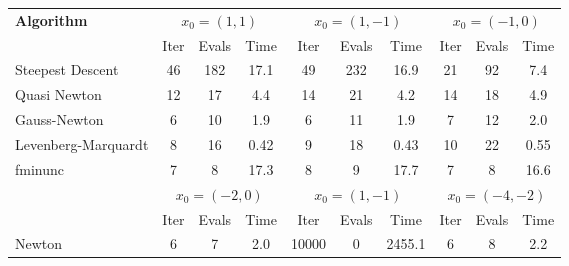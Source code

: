 \begin{tabular}{l|ccc|ccc|ccc} \hline \hline 
{\bf Algorithm} & \multicolumn{3}{c}{$x_0 = (1,1)$} & \multicolumn{3}{c}{$x_0 = (1,-1)$} & \multicolumn{3}{c}{$x_0 = (-1,0)$} \\ 
& Iter & Evals & Time & Iter & Evals & Time & Iter & Evals & Time \\ \hline 
Steepest Descent & 46 & 182 & 17.1 & 49 & 232 & 16.9 & 21 & 92 & 7.4 \\
\hline
Quasi Newton & 12 & 17 & 4.4 & 14 & 21 & 4.2 & 14 & 18 & 4.9 \\ 
\hline
Gauss-Newton & 6 & 10 & 1.9 & 6 & 11 & 1.9 & 7 & 12 & 2.0 \\ 
\hline
Levenberg-Marquardt & 8 & 16 & 0.42 & 9 & 18 & 0.43 & 10 & 22 & 0.55 \\
\hline
fminunc & 7 & 8 & 17.3 & 8 & 9 & 17.7 & 7 & 8 & 16.6 \\ 
\hline \hline
& \multicolumn{3}{c}{$x_0 = (-2,0)$} & \multicolumn{3}{c}{$x_0 = (1,-1)$} & \multicolumn{3}{c}{$x_0 = (-4,-2)$} \\ 
& Iter & Evals & Time & Iter & Evals & Time & Iter & Evals & Time \\ \hline 
Newton & 6 & 7 & 2.0 & 10000 & 0 & 2455.1 & 6 & 8 & 2.2 \\ 
\hline \hline
\end{tabular} 
